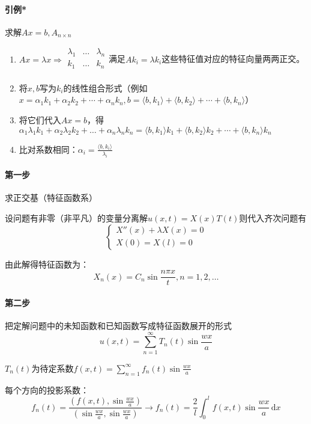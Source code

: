 \paragraph{引例*}求解\(Ax=b,A_{n\times n}\)
\begin{enumerate}
	\item \(Ax=\lambda x\Rightarrow\begin{matrix}\lambda_1&\ldots&\lambda_n\\k_1&\ldots&k_n\\\end{matrix}\)满足\(Ak_i=\lambda k_i\)这些特征值对应的特征向量两两正交。
	\item 将\(x,b\)写为\(k_i\)的线性组合形式（例如\(x=\alpha_1k_1+\alpha_2k_2+\cdots+\alpha_nk_n,b=\langle b,k_1\rangle+\langle b,k_2\rangle+\cdots+\langle b,k_n\rangle\)）
	\item 将它们代入\(Ax=b\)，得\(\alpha_1\lambda_1k_1+\alpha_2\lambda_2k_2+\ldots+\alpha_n\lambda_nk_n=\langle b,k_1\rangle k_1+\langle b,k_2\rangle k_2+\cdots+\langle b,k_n\rangle k_n\)
	\item 比对系数相同：\(\alpha_i=\frac{\langle b,k_i\rangle}{\lambda_i}\)
\end{enumerate}

\paragraph{第一步}求正交基（特征函数系）

设问题有非零（非平凡）的变量分离解\(u(x,t)=X(x)T(t)\)则代入齐次问题有
\[\begin{cases}
X''(x)+\lambda X(x)=0\\
X(0)=X(l)=0
\end{cases}\]

由此解得特征函数为：
\[
X_n(x)=C_n\sin{\frac{n\pi x}{t}},n=1,2,\ldots
\]

\paragraph{第二步}把定解问题中的未知函数和已知函数写成特征函数展开的形式
\[
u(x,t)=\sum_{n=1}^{\infty}{T_n(t)\sin{\frac{wx}{a}}}
\]

\(T_n(t)\)为待定系数\(f(x,t)=\sum\limits_{n=1}^{\infty}{f_n(t)\sin{\frac{wx}{a}}}\)

每个方向的投影系数：
\[
f_n(t)=\frac{\left(f(x,t),\sin{\frac{wx}{a}}\right)}{\left(\sin{\frac{wx}{a}},\sin{\frac{wx}{a}}\right)}\longrightarrow f_n(t)=\frac{2}{l}\int_{0}^{l} f(x,t)\sin{\frac{wx}{a}\,\mathrm{d}x}
\]

